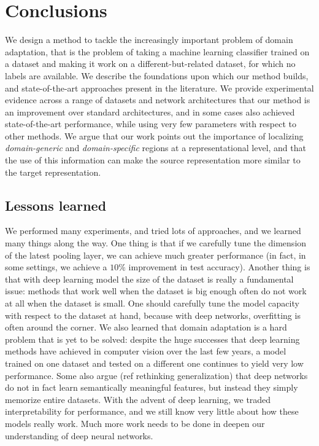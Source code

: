 \documentclass[../main.tex]{subfiles}
\begin{document}
    \chapter{Conclusions}\label{chap:summary}

    We design a method to tackle the increasingly important problem of domain adaptation,
    that is the problem of taking a machine learning classifier trained on a dataset and making it work
    on a different-but-related dataset, for which no labels are available. We describe the foundations
    upon which our method builds, and state-of-the-art approaches present in the literature. We provide
    experimental evidence across a range of datasets and network architectures that our method is an
    improvement over standard architectures, and in some cases also achieved state-of-the-art performance,
    while using very few parameters with respect to other methods. We argue that our work points out the
    importance of localizing \textit{domain-generic} and \textit{domain-specific} regions at a representational
    level, and that the use of this information can make the source representation more similar to the target
    representation.

    \section{Lessons learned}
    We performed many experiments, and tried lots of approaches, and we learned many things along the way.
    One thing is that if we carefully tune the dimension of the latest pooling layer, we can achieve much
    greater performance (in fact, in some settings, we achieve a $10\%$ improvement in test accuracy).
    Another thing is that with deep learning model the size of the dataset is really a fundamental issue:
    methods that work well when the dataset is big enough often do not work at all when the dataset is
    small. One should carefully tune the model capacity with respect to the dataset at hand, because with
    deep networks, overfitting is often around the corner.
    We also learned that domain adaptation is a hard problem that is yet to be solved: despite the huge
    successes that deep learning methods have achieved in computer vision over the last few years, a model
    trained on one dataset and tested on a different one continues to yield very low performance. Some
    also argue (ref rethinking generalization) that deep networks do not in fact learn semantically
    meaningful features, but instead they simply memorize entire datasets. With the advent of deep learning,
    we traded interpretability for performance, and we still know very little about how these models really work.
    Much more work needs to be done in deepen our understanding of deep neural networks.
\end{document}
